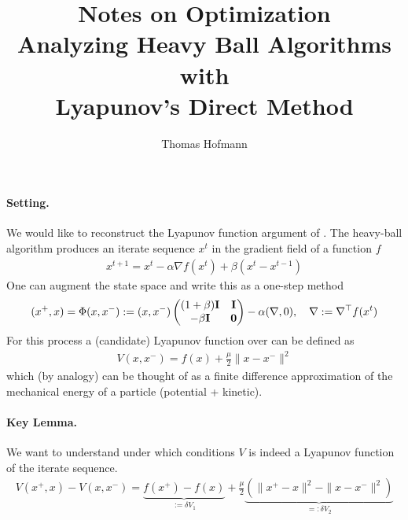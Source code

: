 \documentclass{article}
\title{
	{\large Notes on Optimization} \\[2mm]
	Analyzing Heavy Ball Algorithms with \\  Lyapunov's  Direct Method
}
\author{Thomas Hofmann}
\newcommand{\xp}{{x^+}}
\newcommand{\xx}{{x}}
\newcommand{\xm}{{x^-}}
\newcommand{\mI}{{\bf I}}
\newcommand{\mN}{{\bf 0}}
\begin{document}
\maketitle 

\paragraph{Setting.} We would like to reconstruct the Lyapunov function argument of \cite{zavriev1993heavy}. The heavy-ball algorithm produces an iterate sequence $x^t$ in the gradient field of a function $f$ 
\begin{align}
x^{t+1} = x^t  - \alpha \nabla f(x^t) + \beta (x^t-x^{t-1})
\end{align}
One can augment the state space and write this as a one-step method
\begin{align}
(\xp, \xx) = \Phi(\xx,\xm) :=
(\xx, \xm)
\begin{pmatrix} (1+\beta) \mI & \mI \\  -\beta \mI & \mN  \\  \end{pmatrix} 
  - \alpha (\nabla ,0), \quad \nabla := \nabla^\top f(x^t) 
\end{align}
For this process a (candidate) Lyapunov function over can be defined as 
\begin{align}
V(x,x^-) = f(x) + \frac \mu 2 \| x-x^-\|^2
\end{align}
which (by analogy) can be thought of  as a finite difference approximation of the mechanical energy  of a particle (potential + kinetic). 

\paragraph{Key Lemma.} We want to understand under which conditions $V$ is indeed a Lyapunov function of the iterate sequence. 
\begin{align}
V(x^+,x) - V(x,x^-) = \underbrace{f(\xp) - f(\xx)}_{:=\delta V_1} +\frac\mu2 \underbrace{\left( \| \xp - \xx\|^2 - \| \xx - \xm\|^2 \right)}_{=:\delta V_2}
\end{align}
\end{document}
